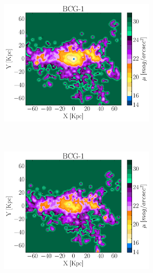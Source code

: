 \begin{figure}[H]
 \centering
 \includegraphics[height=7.5cm, width=7.5cm,trim={0cm   0.1cm 3.5cm 1.cm},clip ]{../al_final/LR/LR_minpot3_rmmax/nodust/grupo0/mu24/D1/026/maps_D1.pdf}
 \includegraphics[height=7.5cm, width=7.5cm,trim={2.8cm 0.1cm 0.3cm 1.cm},clip ]{../al_final/LR/LR_minpot3_rmmax/dust/grupo0/mu24/D1/026/maps_D1.pdf}
\end{figure}


